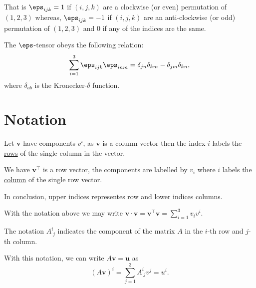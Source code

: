 \documentclass[12pt, a4paper]{article}
\begin{document}
\begin{mdnote}
    That is \(\eps_{ijk}=1\) if \((i,j,k)\) are a clockwise (or even) permutation of \((1,2,3)\) whereas, \(\eps_{ijk}=-1\) if \((i,j,k)\) are an anti-clockwise (or odd) permutation of \((1,2,3)\) and \(0\) if any of the indices are the same.
\end{mdnote}

\begin{mdthm}
    The \(\eps\)-tensor obeys the following relation:
    \[\sum_{i=1}^{3} \eps_{ijk}\eps_{inm} = \delta_{jn}\delta_{km}-\delta_{jm}\delta_{kn},\]
    where \(\delta_{ab}\) is the Kronecker-\(\delta\) function.
\end{mdthm}

\section{Notation}

\begin{definition}
    Let \(\bm{v}\) have components \(v^i\), as \(\bm{v}\) is a column vector then the index \(i\) labels the \ul{rows} of the single column in the vector.
\end{definition}

\begin{definition}
    We have \(\bm{v}^{\top}\) is a row vector, the components are labelled by \(v_i\) where \(i\) labels the \ul{column} of the single row vector.
\end{definition}

\begin{mdnote}
    In conclusion, upper indices representes row and lower indices columns.
\end{mdnote}

\begin{corollary}
    With the notation above we may write \(\bm{v} \cdot \bm{v}= \bm{v}^{\top} \bm{v}= \sum_{i=1}^{3} v_i v^i\).
\end{corollary}

\begin{definition}
    The notation \(A^{i}_{\; j}\) indicates the component of the matrix \(A\) in the \(i\)-th row and \(j\)-th column.
\end{definition}

\begin{mdcor}
    With this notation, we can write \(A\bm{v} =\bm{u}\) as 
    \[(A\bm{v})^i = \sum_{j=1}^3 A^i_{\; j} v^j =u^i.\]
\end{mdcor}
\end{document}
